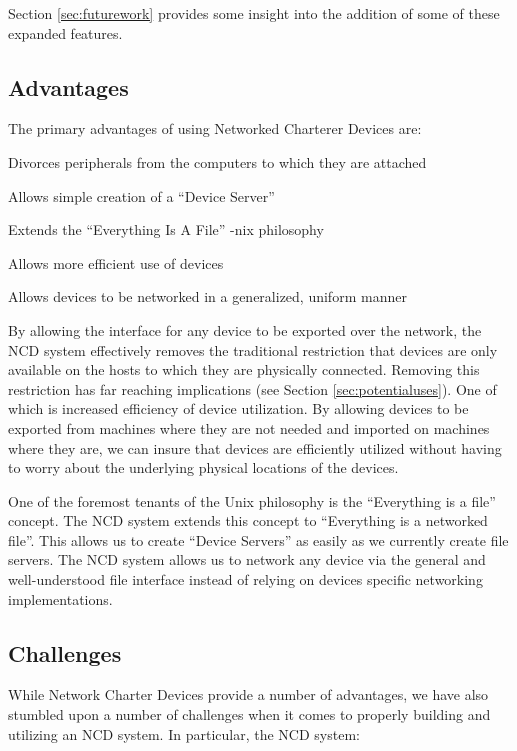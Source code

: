 \documentclass[11pt,twocolumn]{article}
\newenvironment{packed_item}{
\begin{itemize}
  \setlength{\itemsep}{1pt}
  \setlength{\parskip}{0pt}
  \setlength{\parsep}{0pt}
}{\end{itemize}}
\begin{document}
Section \ref{sec:futurework} provides some insight into the addition
of some of these expanded features.

\subsection{Advantages}
\label{sec:advantages}

The primary advantages of using Networked Charterer Devices are:

\begin{packed_item}
\item Divorces peripherals from the computers to which they are
  attached
\item Allows simple creation of a ``Device Server''
\item Extends the ``Everything Is A File'' -nix philosophy
\item Allows more efficient use of devices
\item Allows devices to be networked in a generalized, uniform manner
\end{packed_item}

By allowing the interface for any device to be exported over the
network, the NCD system effectively removes the traditional restriction
that devices are only available on the hosts to which they are
physically connected. Removing this restriction has far reaching
implications (see Section \ref{sec:potentialuses}). One of which is
increased efficiency of device utilization. By allowing devices to
be exported from machines where they are not needed and imported on
machines where they are, we can insure that devices are efficiently
utilized without having to worry about the underlying physical locations
of the devices.

One of the foremost tenants of the Unix philosophy is the ``Everything
is a file'' concept. The NCD system extends this concept to
``Everything is a networked file''. This allows us to create ``Device
Servers'' as easily as we currently create file servers. The NCD
system allows us to network any device via the general and
well-understood file interface instead of relying on devices specific
networking implementations.

\subsection{Challenges}
\label{sec:challenges}

While Network Charter Devices provide a number of advantages, we have
also stumbled upon a number of challenges when it comes to properly
building and utilizing an NCD system. In particular, the NCD system:
\end{document}
